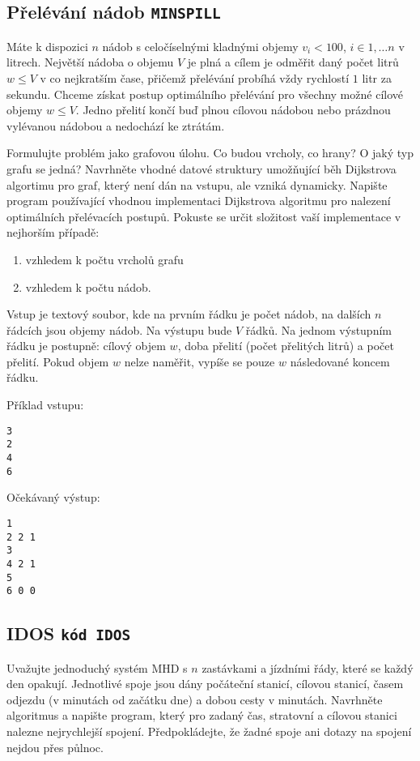 \documentclass[a4paper,10pt]{article}
\begin{document}
\subsection{Přelévání nádob \hfill{\tt MINSPILL}}
 Máte k dispozici $n$ nádob s celočíselnými kladnými objemy $v_i<100$, $i\in 1,\dots n$ v litrech. 
 Největší nádoba o objemu $V$ je plná a cílem je odměřit daný počet litrů $w\le V$ v co nejkratším čase, přičemž přelévání probíhá vždy rychlostí $1$ litr za sekundu. Chceme získat postup optimálního přelévání pro všechny možné cílové objemy $w \le V$.
 Jedno přelití končí buď plnou cílovou nádobou nebo prázdnou vylévanou nádobou a nedochází ke ztrátám. 

 Formulujte problém jako grafovou úlohu. Co budou vrcholy, co hrany?  O jaký typ grafu se jedná?
 Navrhněte vhodné datové struktury umožňující běh Dijkstrova algortimu pro graf, který není dán na vstupu, ale vzniká dynamicky.
 Napište program používající vhodnou implementaci Dijkstrova algoritmu pro nalezení optimálních přelévacích postupů. 
 Pokuste se určit složitost vaší implementace v nejhorším případě: 
 \begin{enumerate}
  \item vzhledem k počtu vrcholů grafu 
  \item vzhledem k počtu nádob.
 \end{enumerate}


 Vstup je textový soubor, kde na prvním řádku je počet nádob, na dalších $n$ řádcích jsou objemy nádob.
 Na výstupu bude $V$ řádků. Na jednom výstupním řádku je postupně: cílový objem $w$, doba přelití (počet přelitých litrů) a počet přelití. Pokud objem $w$ nelze naměřit, vypíše se pouze $w$ následované koncem řádku.
 
Příklad vstupu:
\begin{verbatim}
3
2
4
6
\end{verbatim}

Očekávaný výstup:
\begin{verbatim}
1
2 2 1
3
4 2 1
5
6 0 0
\end{verbatim}


\subsection{IDOS \hfill{\tt kód IDOS}}
Uvažujte jednoduchý systém MHD s $n$ zastávkami a jízdními řády, které se každý den opakují. Jednotlivé spoje jsou dány
počáteční stanicí, cílovou stanicí, časem odjezdu (v minutách od začátku dne) a dobou cesty v minutách. Navrhněte algoritmus a napište program,
který pro zadaný čas, stratovní a cílovou stanici nalezne nejrychlejší spojení. Předpokládejte, že žadné spoje ani dotazy na spojení nejdou přes půlnoc.
\end{document}
